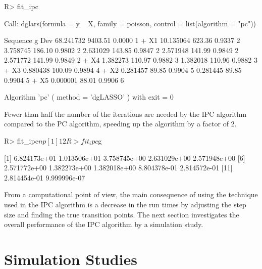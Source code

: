 \begin{example}
R> fit_ipc

Call:  dglars(formula = y ~ X, family = poisson, control = list(algorithm = "pc"))

  Sequence          g      Dev    %
            68.241732  9403.51  0.0000            1
     + X1                                          
            10.135064   623.36  0.9337            2
             3.758745   186.10  0.9802            2
             2.631029   143.85  0.9847            2
             2.571948   141.99  0.9849            2
             2.571772   141.99  0.9849            2
     + X4                                          
             1.382273   110.97  0.9882            3
             1.382018   110.96  0.9882            3
     + X3                                          
             0.880438   100.09  0.9894            4
     + X2                                          
             0.281457    89.85  0.9904            5
             0.281445    89.85  0.9904            5
     + X5                                          
             0.000001    88.01  0.9906            6

Algorithm 'pc' ( method = 'dgLASSO' ) with exit = 0 
\end{example}

Fewer than half the number of the iterations are needed by the IPC algorithm compared to the PC algorithm, speeding up the algorithm by a factor of 2. 

\begin{example}
R> fit_ipc$np

[1] 12

R> fit_ipc$g

[1]  6.824173e+01 1.013506e+01 3.758745e+00 2.631029e+00 2.571948e+00
[6]  2.571772e+00 1.382273e+00 1.382018e+00 8.804378e-01 2.814572e-01 
[11] 2.814454e-01 9.999996e-07
\end{example}

From a computational point of view, the main consequence of using the technique used in the IPC algorithm is a decrease in the run times by adjusting the step size and finding the true transition points. The next section investigates the overall performance of the IPC algorithm by a simulation study.

\section[Simulation Studies]{Simulation Studies}
\label{sec:simstu}


